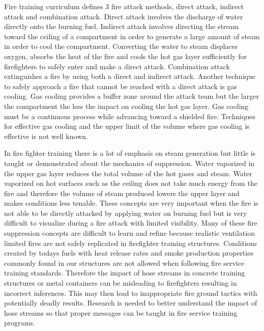 \documentclass{article}
\begin{document}
Fire training curriculum defines 3 fire attack methods, direct attack, indirect attack and combination attack. Direct attack involves the discharge of water directly onto the burning fuel. Indirect attack involves directing the stream toward the ceiling of a compartment in order to generate a large amount of steam in order to cool the compartment. Converting the water to steam displaces oxygen, absorbs the heat of the fire and cools the hot gas layer sufficiently for firefighters to safely enter and make a direct attack. Combination attack extinguishes a fire by using both a direct and indirect attack. Another technique to safely approach a fire that cannot be reached with a direct attack is gas cooling. Gas cooling provides a buffer zone around the attack team but the larger the compartment the less the impact on cooling the hot gas layer. Gas cooling must be a continuous process while advancing toward a shielded fire. Techniques for effective gas cooling and the upper limit of the volume where gas cooling is effective is not well known.  

In fire fighter training there is a lot of emphasis on steam generation but little is taught or demonstrated about the mechanics of suppression. Water vaporized in the upper gas layer reduces the total volume of the hot gases and steam. Water vaporized on hot surfaces such as the ceiling does not take much energy from the fire and therefore the volume of steam produced lowers the upper layer and makes conditions less tenable. These concepts are very important when the fire is not able to be directly attacked by applying water on burning fuel but is very difficult to visualize during a fire attack with limited visibility. Many of these fire suppression concepts are difficult to learn and refine because realistic ventilation limited fires are not safely replicated in firefighter training structures. Conditions created by todays fuels with heat release rates and smoke production properties commonly found in our structures are not allowed when following fire service training standards. Therefore the impact of hose streams in concrete training structures or metal containers can be misleading to firefighters resulting in incorrect inferences. This may then lead to inappropriate fire ground tactics with potentially deadly results. Research is needed to better understand the impact of hose streams so that proper messages can be taught in fire service training programs.
\end{document}
